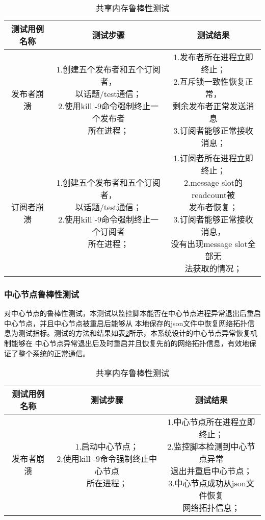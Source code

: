 \begin{table}[H]
  \centering\small
  \caption{共享内存鲁棒性测试}
  \renewcommand\arraystretch{1.2}
  \label{shared_memory_robust}
  \begin{tabular}{ccc}
    \toprule
    测试用例名称 & 测试步骤 & 测试结果 \\
    \midrule
    发布者崩溃 & \makecell[l]{1.创建五个发布者和五个订阅者，\\以话题/test通信；\\2.使用kill -9命令强制终止一个发布者\\所在进程；} & \makecell[l]{1.发布者所在进程立即终止；\\2.互斥锁一致性恢复正常，\\剩余发布者正常发送消息\\3.订阅者能够正常接收消息；}\\
    \hline
    订阅者崩溃 & \makecell[l]{1.创建五个发布者和五个订阅者，\\以话题/test通信；\\2.使用kill -9命令强制终止一个订阅者\\所在进程；} & \makecell[l]{1.订阅者所在进程立即终止；\\2.message slot的readcount被\\发布者恢复；\\3.订阅者能够正常接收消息，\\没有出现message slot全部无\\法获取的情况；} \\
    \bottomrule
  \end{tabular}
\end{table}

\subsubsection{中心节点鲁棒性测试}
对中心节点的鲁棒性测试，本测试以监控脚本能否在中心节点进程异常退出后重启中心节点，并且中心节点被重启后能够从
本地保存的json文件中恢复网络拓扑信息为测试指标。测试的方法和结果如表\ref{master_robust}所示，本系统设计的中心节点异常恢复机制能够在
中心节点异常退出后及时重启并且恢复先前的网络拓扑信息，有效地保证了整个系统的正常通信。

\begin{table}[H]
  \centering\small
  \caption{共享内存鲁棒性测试}
  \renewcommand\arraystretch{1.2}
  \label{master_robust}
  \begin{tabular}{ccc}
    \toprule
    测试用例名称 & 测试步骤 & 测试结果 \\
    \midrule
    发布者崩溃 & \makecell[l]{1.启动中心节点；\\2.使用kill -9命令强制终止中心节点\\所在进程；} & \makecell[l]{1.中心节点所在进程立即终止；\\2.监控脚本检测到中心节点异常\\退出并重启中心节点；\\3.中心节点成功从json文件恢复\\网络拓扑信息；}\\
    \bottomrule
  \end{tabular}
\end{table}

